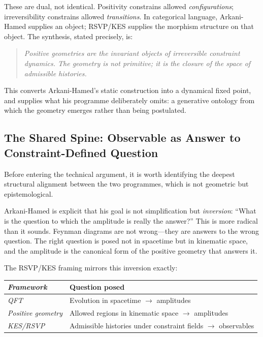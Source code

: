 \documentclass[12pt, oneside]{amsart}
\theoremstyle{plain}
\theoremstyle{definition}
\theoremstyle{remark}
\begin{document}
These are dual, not identical. Positivity constrains allowed \emph{configurations}; irreversibility constrains allowed \emph{transitions}. In categorical language, Arkani-Hamed supplies an object; RSVP/KES supplies the morphism structure on that object. The synthesis, stated precisely, is:

\begin{quote}
\emph{Positive geometries are the invariant objects of irreversible constraint dynamics. The geometry is not primitive; it is the closure of the space of admissible histories.}
\end{quote}

This converts Arkani-Hamed's static construction into a dynamical fixed point, and supplies what his programme deliberately omits: a generative ontology from which the geometry emerges rather than being postulated.

\subsection{The Shared Spine: Observable as Answer to Constraint-Defined Question}

Before entering the technical argument, it is worth identifying the deepest structural alignment between the two programmes, which is not geometric but epistemological.

Arkani-Hamed is explicit that his goal is not simplification but \emph{inversion}: ``What is the question to which the amplitude is really the answer?'' This is more radical than it sounds. Feynman diagrams are not wrong---they are answers to the wrong question. The right question is posed not in spacetime but in kinematic space, and the amplitude is the canonical form of the positive geometry that answers it.

The RSVP/KES framing mirrors this inversion exactly:

\begin{center}
\begin{tabular}{>{\itshape}l l}
\toprule
Framework & Question posed \\
\midrule
QFT & Evolution in spacetime $\to$ amplitudes \\
Positive geometry & Allowed regions in kinematic space $\to$ amplitudes \\
KES/RSVP & Admissible histories under constraint fields $\to$ observables \\
\bottomrule
\end{tabular}
\end{center}
\end{document}
